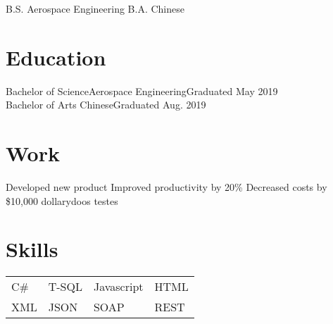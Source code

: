 \documentclass[letterpaper,11pt]{cv_format}
\begin{document}
\centering    B.S. Aerospace Engineering \textperiodcentered B.A. Chinese


\section{Education}

Bachelor of Science\hspace{1cm}Aerospace Engineering\hfill Graduated May 2019 \\
Bachelor of Arts \hspace{1cm}Chinese\hfill Graduated Aug. 2019

\section{Work}
\workitems
{Developed new product}
{Improved productivity by 20\%}
{Decreased costs by \$10,000 dollarydoos}
{testes}
 
\section{Skills}
\begin{tabular}{l l l l}
C\# & T-SQL & Javascript & HTML \\
XML & JSON & SOAP & REST
\end{tabular}
 
\end{document}
